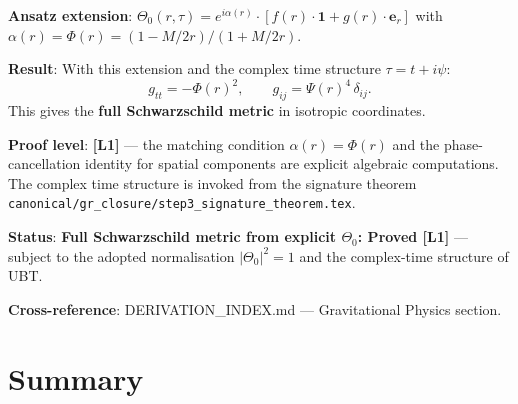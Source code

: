 \documentclass[11pt,a4paper]{article}
\theoremstyle{definition}
\theoremstyle{remark}
\begin{document}
\begin{tcolorbox}[colback=green!5!white,colframe=green!75!black,
                  title={Temporal Component: Status}]
\textbf{Ansatz extension}: $\Theta_0(r,\tau) = e^{i\alpha(r)}\cdot
[f(r)\cdot\mathbf{1} + g(r)\cdot\boldsymbol{e}_r]$ with
$\alpha(r) = \Phi(r) = (1-M/2r)/(1+M/2r)$.

\medskip
\textbf{Result}: With this extension and the complex time structure $\tau = t + i\psi$:
\begin{equation}
  g_{tt} = -\Phi(r)^2,
  \qquad
  g_{ij} = \Psi(r)^4\,\delta_{ij}.
\end{equation}
This gives the \textbf{full Schwarzschild metric} in isotropic coordinates.

\medskip
\textbf{Proof level}: \textbf{[L1]} — the matching condition $\alpha(r) = \Phi(r)$
and the phase-cancellation identity for spatial components are explicit
algebraic computations.  The complex time structure is invoked from
the signature theorem \texttt{canonical/gr\_closure/step3\_signature\_theorem.tex}.

\medskip
\textbf{Status}: \textbf{Full Schwarzschild metric from explicit $\Theta_0$:
Proved [L1]} — subject to the adopted normalisation $|\Theta_0|^2 = 1$
and the complex-time structure of UBT.

\medskip
\textbf{Cross-reference}: DERIVATION\_INDEX.md --- Gravitational Physics section.
\end{tcolorbox}

\section{Summary}
\label{sec:summary}
\end{document}
